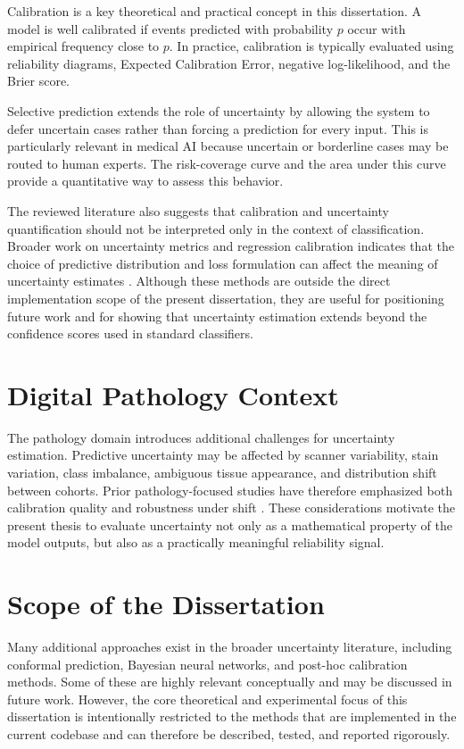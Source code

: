 Calibration is a key theoretical and practical concept in this dissertation. A model is well calibrated if events predicted with probability $p$ occur with empirical frequency close to $p$. In practice, calibration is typically evaluated using reliability diagrams, Expected Calibration Error, negative log-likelihood, and the Brier score.

Selective prediction extends the role of uncertainty by allowing the system to defer uncertain cases rather than forcing a prediction for every input. This is particularly relevant in medical AI because uncertain or borderline cases may be routed to human experts. The risk-coverage curve and the area under this curve provide a quantitative way to assess this behavior.

The reviewed literature also suggests that calibration and uncertainty quantification should not be interpreted only in the context of classification. Broader work on uncertainty metrics and regression calibration indicates that the choice of predictive distribution and loss formulation can affect the meaning of uncertainty estimates \cite{levi2022regression,jordahn2026heteroskedastic}. Although these methods are outside the direct implementation scope of the present dissertation, they are useful for positioning future work and for showing that uncertainty estimation extends beyond the confidence scores used in standard classifiers.

\section{Digital Pathology Context}

The pathology domain introduces additional challenges for uncertainty estimation. Predictive uncertainty may be affected by scanner variability, stain variation, class imbalance, ambiguous tissue appearance, and distribution shift between cohorts. Prior pathology-focused studies have therefore emphasized both calibration quality and robustness under shift \cite{linmans2022ood,thagaard2020datasetshift}. These considerations motivate the present thesis to evaluate uncertainty not only as a mathematical property of the model outputs, but also as a practically meaningful reliability signal.

\section{Scope of the Dissertation}

Many additional approaches exist in the broader uncertainty literature, including conformal prediction, Bayesian neural networks, and post-hoc calibration methods. Some of these are highly relevant conceptually and may be discussed in future work. However, the core theoretical and experimental focus of this dissertation is intentionally restricted to the methods that are implemented in the current codebase and can therefore be described, tested, and reported rigorously.
